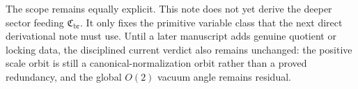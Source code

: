 \documentclass[11pt]{article}
\newcommand{\PrimClass}{\mathfrak C_{\mathrm{br}}}
\begin{document}
The scope remains equally explicit. This note does not yet derive the deeper sector feeding \(\PrimClass\). It only fixes the primitive variable class that the next direct derivational note must use. Until a later manuscript adds genuine quotient or locking data, the disciplined current verdict also remains unchanged: the positive scale orbit is still a canonical-normalization orbit rather than a proved redundancy, and the global \(O(2)\) vacuum angle remains residual.
\end{document}
